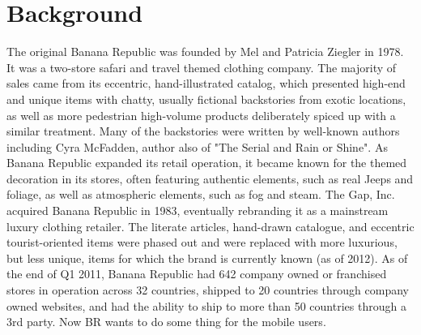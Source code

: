 \documentclass[12pt,letterpaper]{article}
\theoremstyle{definition}
\begin{document}
\section{Background} 
The original Banana Republic was founded by Mel and Patricia Ziegler in 1978. It was a two-store safari and travel themed clothing company. The majority of sales came from its eccentric, hand-illustrated catalog, which presented high-end and unique items with chatty, usually fictional backstories from exotic locations, as well as more pedestrian high-volume products deliberately spiced up with a similar treatment. Many of the backstories were written by well-known authors including Cyra McFadden, author also of "The Serial and Rain or Shine". As Banana Republic expanded its retail operation, it became known for the themed decoration in its stores, often featuring authentic elements, such as real Jeeps and foliage, as well as atmospheric elements, such as fog and steam. The Gap, Inc. acquired Banana Republic in 1983, eventually rebranding it as a mainstream luxury clothing retailer. The literate articles, hand-drawn catalogue, and eccentric tourist-oriented items were phased out and were replaced with more luxurious, but less unique, items for which the brand is currently known (as of 2012). As of the end of Q1 2011, Banana Republic had 642 company owned or franchised stores in operation across 32 countries, shipped to 20 countries through company owned websites, and had the ability to ship to more than 50 countries through a 3rd party. Now BR wants to do some thing for the mobile users.
\end{document}
